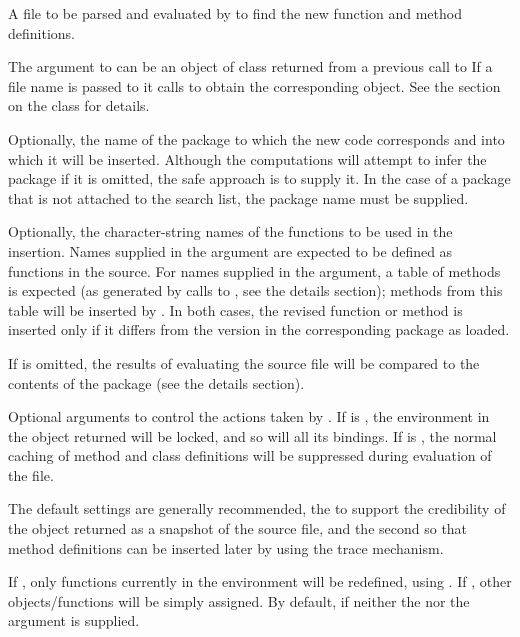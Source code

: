 \begin{Arguments}
\begin{ldescription}
\item[\code{source}] 
A file to be parsed and evaluated by  to find the new
function and method definitions.

The argument to  can be an object of class 
returned from a previous call
to    If a file name is passed to 
it calls  to obtain the corresponding object.  See
the section on the class for details.


\item[\code{package}] 
Optionally, the name of the package to which the new code corresponds
and into which it will be
inserted.  Although the computations will attempt to infer the package
if it is omitted, the safe approach is to supply it.  In the case of a
package that is not attached to the search list, the package name must
be supplied.

\item[\code{functions, methods}] 
Optionally, the character-string names of the functions to be
used in the insertion.  Names supplied in the 
argument are expected to be defined as functions in the source.
For names supplied in the  argument, a table of methods
is expected (as generated by calls to , see the
details section); methods from this table will be inserted by
.  In both cases, the revised function or method is
inserted only if it differs from the version in the corresponding
package as loaded.

If  is omitted, the results of evaluating the source file
will be compared to the contents of the package (see the details section).

\item[\code{lock, cache}] 
Optional arguments to control the actions taken by .
If  is , the environment in the object returned
will be locked, and so will all its bindings.
If  is , the normal caching of method and
class definitions will be suppressed during evaluation of the
 file.

The default settings are generally recommended, the  to
support the credibility of the object returned as a snapshot of the
source file, and the second so that method definitions can be inserted
later by  using the trace mechanism.

\item[\code{force}] 
If , only functions currently in the environment will be
redefined, using .  If , other
objects/functions will be simply assigned.  By default,  if
neither the  nor the  argument is supplied.


\end{ldescription}
\end{Arguments}
